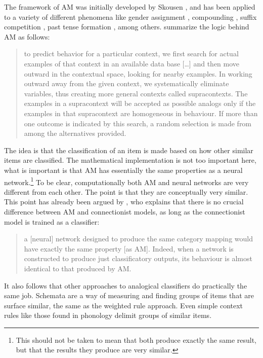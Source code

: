 The framework of AM was initially developed by Skousen \autocites{Skousen.1989, Skousen.2002, Skousen.2013}, and has been applied to a variety of different phenomena like gender assignment \autocites{Eddington.2002, Eddington.2004}, compounding \autocite{Arndt-Lappe.2011}, suffix competition \autocite{Arndt-Lappe.2014}, past tense formation \autocite{Derwing.1994}, among others. \textcite[p. 193]{Derwing.1994} summarize the logic behind AM as follows:

\begin{quotation}
to predict behavior for a particular context, we first search for actual examples of that context in an available data base [\dots] and then move outward in the contextual space, looking for nearby examples. In working outward away from the given context, we systematically eliminate variables, thus creating more general contexts called supracontexts. The examples in a supracontext will be accepted as possible analogs only if the examples in that supracontext are homogeneous in behaviour. If more than one outcome is indicated by this search, a random selection is made from among the alternatives provided.
\end{quotation}

The idea is that the classification of an item is made based on how other similar items are classified. The mathematical implementation is not too important here, what is important is that AM has essentially the same properties as a neural network.\footnote{This should not be taken to mean that both produce exactly the same result, but that the results they produce are very similar.} To be clear, computationally both AM and neural networks are very different from each other. The point is that they are conceptually very similar. This point has already been argued by \textcite[p. 289]{Matthews.2005}, who explains that there is no crucial difference between AM and connectionist models, as long as the connectionist model is trained as a classifier:

\begin{quotation}
a [neural] network designed to produce the same category mapping would have exactly the same property [as AM]. Indeed, when a network is constructed to produce just classificatory outputs, its behaviour is almost identical to that produced by AM.
\end{quotation}

It also follows that other approaches to analogical classifiers do practically the same job. Schemata are a way of measuring and finding groups of items that are surface similar, the same as the weighted rule approach. Even simple context rules like those found in phonology delimit groups of similar items.

